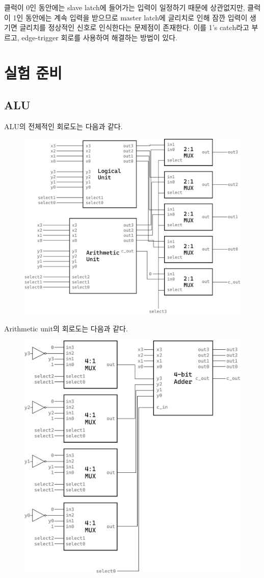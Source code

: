 \documentclass{scrartcl}
\begin{document}
클럭이 0인 동안에는 slave latch에 들어가는 입력이 일정하기 때문에 상관없지만, 클럭이 1인 동안에는 계속 입력을 받으므로 master latch에 글리치로 인해 잠깐 입력이 생기면 글리치를 정상적인 신호로 인식한다는 문제점이 존재한다.
이를 1's catch라고 부르고, edge-trigger 회로를 사용하여 해결하는 방법이 있다.

\section{실험 준비}
\subsection{ALU}
ALU의 전체적인 회로도는 다음과 같다.
\begin{figure}[H]
  \centering
  \includegraphics[width=0.9\linewidth]{alu_schematic.pdf}
\end{figure}

Arithmetic unit의 회로도는 다음과 같다.
\begin{figure}[H]
  \centering
  \includegraphics[width=0.9\linewidth]{arith_unit_schematic.pdf}
\end{figure}
\end{document}
